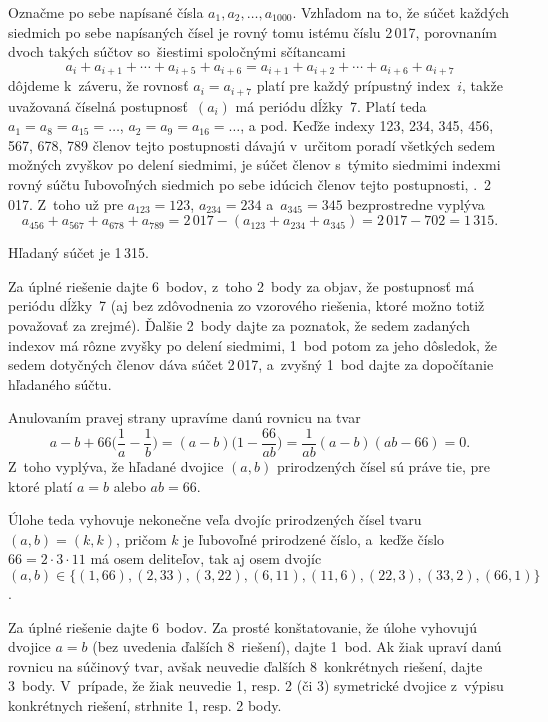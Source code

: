 {%
Označme po sebe napísané čísla $a_1,a_2,\dots ,a_{1000}$. Vzhľadom
na to, že súčet každých siedmich po sebe napísaných čísel je rovný tomu istému
číslu 2\,017, porovnaním dvoch takých súčtov so~šiestimi spoločnými sčítancami
$$
a_i+a_{i+1}+\cdots+a_{i+5}+a_{i+6}=a_{i+1}+a_{i+2}+\cdots+a_{i+6}+a_{i+7}
$$
dôjdeme k~záveru, že rovnosť $a_i=a_{i+7}$ platí pre každý prípustný index~$i$, takže
uvažovaná číselná postupnosť~$(a_i)$ má periódu dĺžky~7. Platí
teda $a_1=a_8={a_{15}=\dots}$, $a_2=a_9=a_{16}=\dots$, a pod. Keďže
indexy 123, 234, 345, 456, 567, 678, 789 členov tejto postupnosti dávajú
v~určitom poradí všetkých sedem možných zvyškov po delení siedmimi, je súčet členov
s~týmito siedmimi indexmi rovný súčtu ľubovoľných siedmich po sebe idúcich
členov tejto postupnosti, \tj.~2\,017. Z~toho už pre
$a_{123}=123$, $a_{234}=234$ a~$a_{345}=345$ bezprostredne vyplýva
$$
a_{456}+a_{567}+a_{678}+a_{789}=2\,017-(a_{123}+a_{234}+a_{345})=2\,017-702=1\,315.
$$

\zaver
Hľadaný súčet je 1\,315.

\nobreak\medskip\petit\noindent
Za úplné riešenie dajte 6~bodov, z~toho 2~body za objav, že postupnosť má periódu
dĺžky~7 (aj bez zdôvodnenia zo vzorového riešenia, ktoré možno totiž považovať za zrejmé).
Ďalšie 2~body dajte za poznatok, že sedem zadaných indexov má rôzne zvyšky
po delení siedmimi, 1~bod potom za jeho dôsledok, že sedem dotyčných členov dáva
súčet 2\,017, a~zvyšný 1~bod dajte za dopočítanie hľadaného súčtu.

\endpetit
\bigbreak
}

{%
Anulovaním pravej strany upravíme danú rovnicu na tvar
$$
a-b+66\Big(\frac1a-\frac1b\Big)=(a-b)\Big(1-\frac{66}{ab}\Big)=\frac{1}{ab}(a-b)(ab-66)=0.
$$
Z~toho vyplýva, že hľadané dvojice $(a,b)$ prirodzených čísel sú práve tie,
pre ktoré platí $a=b$ alebo $ab=66$.

Úlohe teda vyhovuje nekonečne veľa dvojíc prirodzených čísel tvaru $(a,b)=(k,k)$,
pričom $k$ je ľubovoľné prirodzené číslo, a~keďže
číslo $66=2\cdot3\cdot11$ má osem deliteľov, tak aj osem dvojíc
$(a,b)\in\{(1, 66),(2, 33),(3, 22),(6, 11),(11, 6),(22, 3),(33, 2),(66, 1)\}$.

\nobreak\medskip\petit\noindent
Za úplné riešenie dajte 6~bodov.
Za prosté konštatovanie,
že úlohe vyhovujú dvojice $a=b$ (bez uvedenia ďalších 8~riešení),
dajte 1~bod. Ak žiak upraví danú rovnicu na súčinový tvar,
avšak neuvedie ďalších 8~konkrétnych riešení, dajte 3~body.
V~prípade,
že žiak neuvedie 1, resp. 2 (či 3) symetrické dvojice z~výpisu
konkrétnych riešení, strhnite 1, resp. 2 body.
\endpetit
\bigbreak
}


